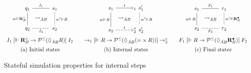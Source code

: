 \documentclass[acmsmall,screen,review,anonymous]{acmart}
\newcommand{\ifr}[1]{\mathrel{[{#1}]}}
\newcommand{\que}{\circ}
\newcommand{\ans}{\bullet}
\begin{document}
\begin{figure}[h]
  \small
  \[
    \begin{array}{c@{\qquad}c@{\qquad}c}
      \begin{tikzcd}[sep=tiny,column sep=0]
        q_1 \ar[dd, "w \Vdash \mathbf{R}_B^\que"', dash] \ar[rr, dash, "I_1"] &&
        s_1 \ar[dd, "w' \Vdash R", dash, dashed] \\
        & \leadsto_{\bar{A}B} & \\
        q_2 \ar[rr, "I_2"', dash, dashed] &&
        s_2
      \end{tikzcd}
      &
      \begin{tikzcd}[sep=tiny,column sep=0]
        s_1 \ar[rr, "t"] \ar[dd, "w \Vdash R"', dash] &&
        \!\!{}_1 \:\, s_1' \ar[dd, "w' \Vdash R", dash, dashed] \\
        & \leadsto_{\bar{A}B} & \\
        s_2 \ar[rr, "t", dashed] &&
        \!\!{}_2^* \:\, s_2'
      \end{tikzcd}
      &
      \begin{tikzcd}[sep=tiny, column sep=0]
        s_1 \ar[rr, "F_1", dash] \ar[dd, "w \Vdash R"', dash] &&
        r_1 \ar[dd, "w' \Vdash \mathbf{R}_B^\ans", dash, dashed] \\
        & \leadsto_{\bar{A}B} & \\
        s_2 \ar[rr, "F_2"', dash, dashed] &&
        r_2
      \end{tikzcd}
      \vspace{1ex} \\
      I_1 \ifr{\Vdash \mathbf{R}_B^\que \rightarrow
        \mathcal{P}^\le(\Diamond_{\bar{A}B} R)} I_2
      &
      {\rightarrow_1}
      \ifr{\Vdash R \rightarrow \mathcal{P}^\le(\Diamond_{\bar{A}B} ({=} \times R))}
      {\rightarrow_2^*}
      &
      F_1
      \ifr{\Vdash R \rightarrow \mathcal{P}^\le(\Diamond_{\bar{A}B} \mathbf{R}_B^\ans)}
      F_2
      \vspace{1.2ex} \\
      \text{(a) Initial states} &
      \text{(b) Internal states} &
      \text{(c) Final states}
    \end{array}
  \]
  \caption{Stateful simulation properties for internal steps}
  \label{fig:simint}
\end{figure}
\end{document}
